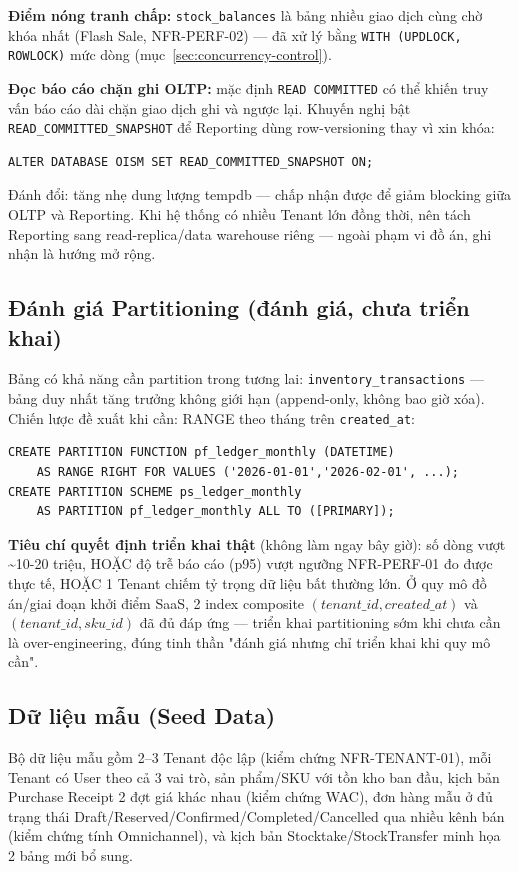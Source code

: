 \textbf{Điểm nóng tranh chấp:} \texttt{stock\_balances} là bảng nhiều giao dịch cùng chờ khóa nhất (Flash Sale, NFR-PERF-02) — đã xử lý bằng \texttt{WITH (UPDLOCK, ROWLOCK)} mức dòng (mục~\ref{sec:concurrency-control}).

\textbf{Đọc báo cáo chặn ghi OLTP:} mặc định \texttt{READ COMMITTED} có thể khiến truy vấn báo cáo dài chặn giao dịch ghi và ngược lại. Khuyến nghị bật \texttt{READ\_COMMITTED\_SNAPSHOT} để Reporting dùng row-versioning thay vì xin khóa:
\begin{lstlisting}
ALTER DATABASE OISM SET READ_COMMITTED_SNAPSHOT ON;
\end{lstlisting}
Đánh đổi: tăng nhẹ dung lượng tempdb — chấp nhận được để giảm blocking giữa OLTP và Reporting. Khi hệ thống có nhiều Tenant lớn đồng thời, nên tách Reporting sang read-replica/data warehouse riêng — ngoài phạm vi đồ án, ghi nhận là hướng mở rộng.

\subsection{Đánh giá Partitioning (đánh giá, chưa triển khai)}
Bảng có khả năng cần partition trong tương lai: \texttt{inventory\_transactions} — bảng duy nhất tăng trưởng không giới hạn (append-only, không bao giờ xóa). Chiến lược đề xuất khi cần: RANGE theo tháng trên \texttt{created\_at}:
\begin{lstlisting}
CREATE PARTITION FUNCTION pf_ledger_monthly (DATETIME)
    AS RANGE RIGHT FOR VALUES ('2026-01-01','2026-02-01', ...);
CREATE PARTITION SCHEME ps_ledger_monthly
    AS PARTITION pf_ledger_monthly ALL TO ([PRIMARY]);
\end{lstlisting}
\textbf{Tiêu chí quyết định triển khai thật} (không làm ngay bây giờ): số dòng vượt \textasciitilde10-20 triệu, HOẶC độ trễ báo cáo (p95) vượt ngưỡng NFR-PERF-01 đo được thực tế, HOẶC 1 Tenant chiếm tỷ trọng dữ liệu bất thường lớn. Ở quy mô đồ án/giai đoạn khởi điểm SaaS, 2 index composite \((tenant\_id, created\_at)\) và \((tenant\_id, sku\_id)\) đã đủ đáp ứng — triển khai partitioning sớm khi chưa cần là over-engineering, đúng tinh thần "đánh giá nhưng chỉ triển khai khi quy mô cần".

\subsection{Dữ liệu mẫu (Seed Data)}
Bộ dữ liệu mẫu gồm 2--3 Tenant độc lập (kiểm chứng NFR-TENANT-01), mỗi Tenant có User theo cả 3 vai trò, sản phẩm/SKU với tồn kho ban đầu, kịch bản Purchase Receipt 2 đợt giá khác nhau (kiểm chứng WAC), đơn hàng mẫu ở đủ trạng thái Draft/Reserved/Confirmed/Completed/Cancelled qua nhiều kênh bán (kiểm chứng tính Omnichannel), và kịch bản Stocktake/StockTransfer minh họa 2 bảng mới bổ sung.

